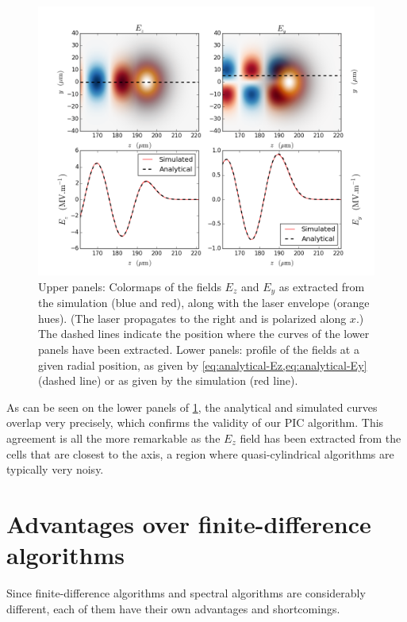 \documentclass[1p,times]{elsarticle}
\begin{document}
\begin{figure}[!h]
\centering
\includegraphics[width=\textwidth]{figures/Linear_wkfld.png}
\caption{\label{fig:Linear_wkfld}Upper panels: Colormaps of the fields $E_z$ and
  $E_y$ as extracted from the simulation (blue and red), along with
  the laser envelope (orange hues). (The laser propagates to the
  right and is polarized along $x$.) The dashed lines indicate the
  position where the curves of the lower panels have been extracted. 
Lower panels: profile of the fields at a given radial
position, as given by \cref{eq:analytical-Ez,eq:analytical-Ey} (dashed
line) or as given by the simulation (red line).}
\end{figure}

As can be seen on the lower panels of \cref{fig:Linear_wkfld}, the
analytical and simulated curves overlap very precisely, which confirms
the validity of our PIC algorithm. This agreement is all
the more remarkable as the $E_z$ field has been extracted from the cells
that are closest to the axis, a region where quasi-cylindrical algorithms
are typically very noisy.

\section{Advantages over finite-difference algorithms}
\label{sec:advantages}

Since finite-difference algorithms and spectral algorithms are
considerably different, each of them have their own advantages and
shortcomings. 
\end{document}
